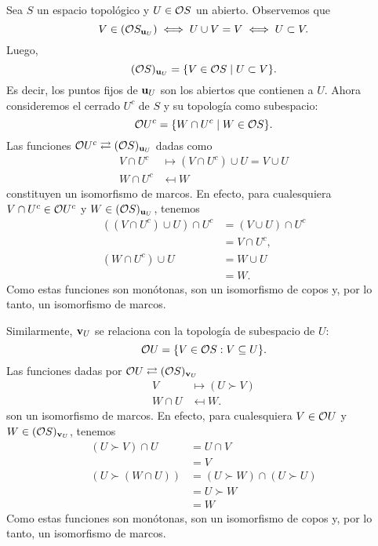 \begin{exa}%
    \label{exe:cociente-abierto-cerrado}
    Sea $S$ un espacio topológico y $U\in\cal OS$ un abierto.
    Observemos que
    \[
        V \in(\cal OS_{\unuc U}) \iff U\cup V=V \iff U\subset V
    .\]
    Luego,
    \[
        (\cal OS)_{\unuc U} = \{V\in \cal OS \mid U\subset V\}
    .\]
    Es decir, los puntos fijos de $\unuc U$ son los abiertos
    que contienen a $U$.
    Ahora consideremos el cerrado $U^c$ de $S$ y su topología
    como subespacio:
    \[
      \cal OU^c = \{W\cap U^c \mid W\in\cal OS\}
    .\]
    Las funciones
    $\cal OU^c\rightleftarrows(\cal OS)_{\unuc U}$
    dadas como
    \begin{align*}
      V\cap U^c &\mapsto (V\cap U^c)\cup U = V\cup U \\
      W\cap U^c &\mapsfrom W
    \end{align*}
    constituyen un isomorfismo de marcos.
    En efecto, para cualesquiera $V\cap U^c\in\cal OU^c$ y
    $W\in(\cal OS)_{\unuc U}$, tenemos
    \begin{align*}
      ((V\cap U^c)\cup U)\cap U^c
      &= (V\cup U)\cap U^c \\
      &= V\cap U^c, \\
      (W\cap U^c)\cup U
      &= W\cup U \\
      &= W.
    \end{align*}
    Como estas funciones son monótonas, son un isomorfismo de
    copos y, por lo tanto, un isomorfismo de marcos.

    Similarmente, $\vnuc U$ se relaciona con la topología de
    subespacio de $U$:
    \[
      \cal OU
      =
      \{V\in \cal OS : V\subseteq U\}
    .\]
    Las funciones dadas por
    $\cal OU\rightleftarrows(\cal OS)_{\vnuc U}$
    \begin{align*}
         V &\mapsto (U\succ V) \\
         W\cap U &\mapsfrom W.
    \end{align*}
    son un isomorfismo de marcos.
    En efecto, para cualesquiera $V\in \cal OU$
    y $W\in (\cal OS)_{\vnuc U}$, tenemos
    \begin{align*}
        (U\succ V)\cap U
        &= U\cap V \\
        &= V \\
        (U\succ (W\cap U))
        &= (U\succ W)\cap(U\succ U) \\
        &= U\succ W \\
        &= W
    \end{align*}
    Como estas funciones son monótonas,
    son un isomorfismo de copos y, por lo tanto,
    un isomorfismo de marcos.
\end{exa}

